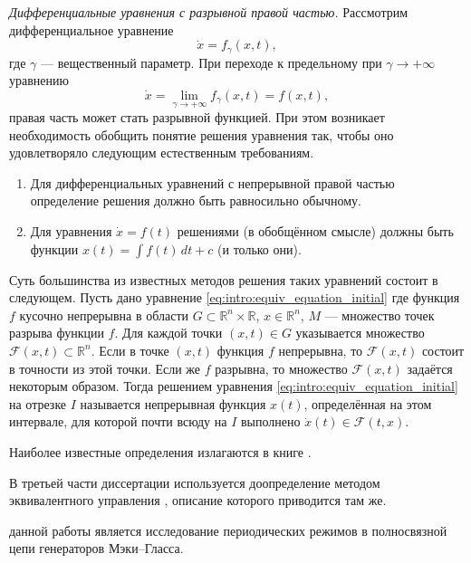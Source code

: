 \textit{Дифференциальные уравнения с разрывной правой частью.} Рассмотрим дифференциальное уравнение 
\[
\dot{x} = f_{\gamma}(x, t),
\]
где $\gamma$ --- вещественный параметр. При переходе к предельному при $\gamma \to +\infty$ уравнению
\begin{equation}
	\label{eq:intro:equiv_equation_initial}
	\dot{x} = \lim\limits_{\gamma \to +\infty}f_{\gamma}(x, t) = f(x, t),
\end{equation}
правая часть может стать разрывной функцией. При этом возникает необходимость обобщить понятие решения уравнения так, чтобы оно удовлетворяло следующим естественным требованиям.
\begin{enumerate}
	\item Для дифференциальных уравнений с непрерывной правой частью определение решения должно быть равносильно обычному.
	\item Для уравнения $\dot{x} = f(t)$ решениями (в обобщённом смысле) должны быть функции $x(t) = \int f(t)\, dt + c$ (и только они).
\end{enumerate}
Суть большинства из известных методов решения таких уравнений состоит в следующем. Пусть дано уравнение \eqref{eq:intro:equiv_equation_initial} где функция $f$ кусочно непрерывна в области $G \subset \mathbb{R}^n \times \mathbb{R}$, $x \in \mathbb{R}^n$, $M$ --- множество точек разрыва функции $f$. Для каждой точки $(x, t) \in G$ указывается множество $\mathcal{F}(x, t) \subset \mathbb{R}^n$. Если в точке $(x, t)$ функция $f$ непрерывна, то $\mathcal{F}(x, t)$ состоит в точности из этой точки. Если же $f$ разрывна, то множество $\mathcal{F}(x, t)$ задаётся некоторым образом. Тогда решением уравнения \eqref{eq:intro:equiv_equation_initial} на отрезке $I$ называется непрерывная функция $x(t)$, определённая на этом интервале, для которой почти всюду на $I$ выполнено $\dot{x}(t) \in \mathcal{F}(t, x)$.

Наиболее известные определения излагаются в книге \cite[\S 4]{Filippov1988}.

В третьей части диссертации используется доопределение методом эквивалентного управления \cite{Utkin1981}, описание которого приводится там же.

\bigskip

{\aim} данной работы является исследование периодических режимов в полносвязной цепи генераторов Мэки--Гласса.

